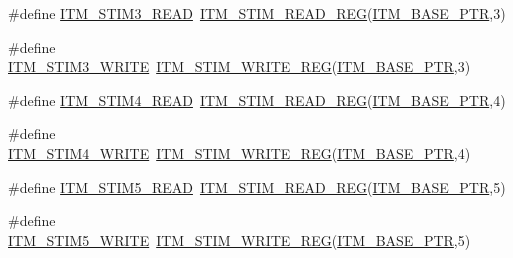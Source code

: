 \begin{DoxyCompactItemize}
\item 
\#define \hyperlink{group___i_t_m___register___accessor___macros_gac2585aa635223db51bc5dfb64d5901f0}{I\+T\+M\+\_\+\+S\+T\+I\+M3\+\_\+\+R\+E\+AD}~\hyperlink{group___i_t_m___register___accessor___macros_ga5009882336aadcd4f37b45cf3395c450}{I\+T\+M\+\_\+\+S\+T\+I\+M\+\_\+\+R\+E\+A\+D\+\_\+\+R\+EG}(\hyperlink{group___i_t_m___peripheral_gafaddee8fe8b6a898d4e5edc43ee0d703}{I\+T\+M\+\_\+\+B\+A\+S\+E\+\_\+\+P\+TR},3)
\item 
\#define \hyperlink{group___i_t_m___register___accessor___macros_ga5dd9fe046bf774394e98b8aae32f09be}{I\+T\+M\+\_\+\+S\+T\+I\+M3\+\_\+\+W\+R\+I\+TE}~\hyperlink{group___i_t_m___register___accessor___macros_ga049ca92a4e78e77c19af81e51aa73f1c}{I\+T\+M\+\_\+\+S\+T\+I\+M\+\_\+\+W\+R\+I\+T\+E\+\_\+\+R\+EG}(\hyperlink{group___i_t_m___peripheral_gafaddee8fe8b6a898d4e5edc43ee0d703}{I\+T\+M\+\_\+\+B\+A\+S\+E\+\_\+\+P\+TR},3)
\item 
\#define \hyperlink{group___i_t_m___register___accessor___macros_ga7bc9ebee3625b9f578807478ac2a35fc}{I\+T\+M\+\_\+\+S\+T\+I\+M4\+\_\+\+R\+E\+AD}~\hyperlink{group___i_t_m___register___accessor___macros_ga5009882336aadcd4f37b45cf3395c450}{I\+T\+M\+\_\+\+S\+T\+I\+M\+\_\+\+R\+E\+A\+D\+\_\+\+R\+EG}(\hyperlink{group___i_t_m___peripheral_gafaddee8fe8b6a898d4e5edc43ee0d703}{I\+T\+M\+\_\+\+B\+A\+S\+E\+\_\+\+P\+TR},4)
\item 
\#define \hyperlink{group___i_t_m___register___accessor___macros_ga15f21956568cb77bc35327f9f4742b0f}{I\+T\+M\+\_\+\+S\+T\+I\+M4\+\_\+\+W\+R\+I\+TE}~\hyperlink{group___i_t_m___register___accessor___macros_ga049ca92a4e78e77c19af81e51aa73f1c}{I\+T\+M\+\_\+\+S\+T\+I\+M\+\_\+\+W\+R\+I\+T\+E\+\_\+\+R\+EG}(\hyperlink{group___i_t_m___peripheral_gafaddee8fe8b6a898d4e5edc43ee0d703}{I\+T\+M\+\_\+\+B\+A\+S\+E\+\_\+\+P\+TR},4)
\item 
\#define \hyperlink{group___i_t_m___register___accessor___macros_ga71729386b6675413e54bbae85ca5f6b4}{I\+T\+M\+\_\+\+S\+T\+I\+M5\+\_\+\+R\+E\+AD}~\hyperlink{group___i_t_m___register___accessor___macros_ga5009882336aadcd4f37b45cf3395c450}{I\+T\+M\+\_\+\+S\+T\+I\+M\+\_\+\+R\+E\+A\+D\+\_\+\+R\+EG}(\hyperlink{group___i_t_m___peripheral_gafaddee8fe8b6a898d4e5edc43ee0d703}{I\+T\+M\+\_\+\+B\+A\+S\+E\+\_\+\+P\+TR},5)
\item 
\#define \hyperlink{group___i_t_m___register___accessor___macros_ga07b231bcf27e2a69fe3168aa387fc4b7}{I\+T\+M\+\_\+\+S\+T\+I\+M5\+\_\+\+W\+R\+I\+TE}~\hyperlink{group___i_t_m___register___accessor___macros_ga049ca92a4e78e77c19af81e51aa73f1c}{I\+T\+M\+\_\+\+S\+T\+I\+M\+\_\+\+W\+R\+I\+T\+E\+\_\+\+R\+EG}(\hyperlink{group___i_t_m___peripheral_gafaddee8fe8b6a898d4e5edc43ee0d703}{I\+T\+M\+\_\+\+B\+A\+S\+E\+\_\+\+P\+TR},5)

\end{DoxyCompactItemize}
